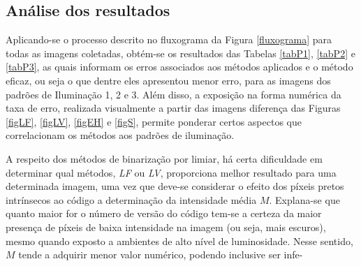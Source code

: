 \documentclass{ceel}
\begin{document}
\begin{multicols}{2}
\begin{minipage}[h]{\columnwidth}
\vspace{-0.1cm}
\caption{Imagens resultantes da Binarização Pós Equalização por Histograma para o QR Code 3 nos padrões de (a) Iluminação 1, (c) Iluminação 2 e (e) Iluminação 3, com suas respectivas imagens diferença em (b), (d) e (f).} \label{figEH}
\end{minipage}

\section{Análise dos resultados} \label{resultados}
Aplicando-se o processo descrito no fluxograma da Figura \ref{fluxograma} para todas as imagens coletadas, obtém-se os resultados das Tabelas \ref{tabP1}, \ref{tabP2} e \ref{tabP3}, as quais informam os erros associados aos métodos aplicados e o método eficaz, ou seja o que dentre eles apresentou menor erro, para as imagens dos padrões de Iluminação 1, 2 e 3. 
Além disso, a exposição na forma numérica da taxa de erro, realizada visualmente a partir das imagens diferença das Figuras \ref{figLF}, \ref{figLV}, \ref{figEH} e \ref{figS}, permite ponderar certos aspectos que correlacionam os métodos aos padrões de iluminação.

A respeito dos métodos de binarização por limiar, há certa dificuldade em determinar qual métodos, \emph{LF} ou \emph{LV}, proporciona melhor resultado para uma determinada imagem, uma vez que deve-se considerar o efeito dos píxeis pretos intrínsecos ao código a determinação da intensidade média $M$. Explana-se que quanto maior for o número de versão do código tem-se a certeza da maior presença de píxeis de baixa intensidade na imagem (ou seja, mais escuros), mesmo quando exposto a ambientes de alto nível de luminosidade. Nesse sentido, $M$ tende a adquirir menor valor numérico, podendo inclusive ser infe-
\columnbreak


\end{multicols}
\end{document}
